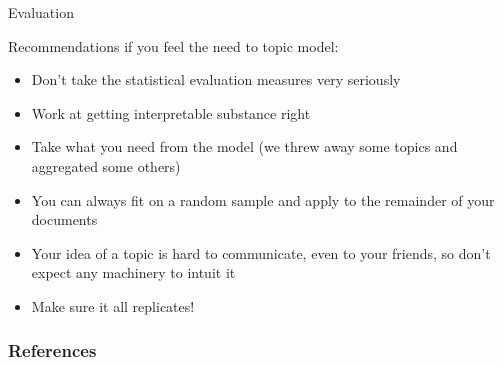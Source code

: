\documentclass{hertieteaching}
\begin{document}
\begin{frame}{Evaluation}

Recommendations if you feel the need to topic model:
\begin{itemize}
  \item Don't take the statistical evaluation measures very seriously
  \item Work at getting interpretable substance right
  \item Take what you need from the model (we threw away some topics and aggregated some others) 
  \item You can always fit on a random sample and apply to the remainder of your documents
  \item Your idea of a topic is hard to communicate, even to your friends, so don't expect any machinery to intuit it
  \item Make sure it all replicates!
\end{itemize}

\end{frame}



%
%
%
%
%
%
%
%
%
%
%
%
%
%
%
%
%
%
%
%
%
%
%
%
%
%
%
%
%
%




\begin{frame}[allowframebreaks]
\frametitle{References}
\printbibliography	
\end{frame}
\end{document}
